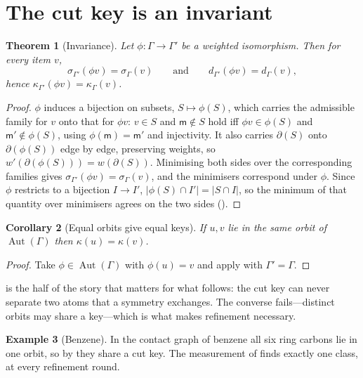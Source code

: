 \documentclass[11pt,twocolumn,a4paper]{article}
\theoremstyle{crthm}
\newtheorem{theorem}{Theorem}[section]
\newtheorem{corollary}[theorem]{Corollary}
\theoremstyle{definition}
\newtheorem{example}[theorem]{Example}
\theoremstyle{remark}
\newcommand{\Gph}{\Gamma}
\newcommand{\wt}{w}
\newcommand{\med}{\mathsf{m}}
\newcommand{\cut}{\partial}
\newcommand{\sep}{\sigma}
\newcommand{\dep}{d}
\newcommand{\key}{\kappa}
\newcommand{\abs}[1]{\lvert#1\rvert}
\newcommand{\Aut}{\operatorname{Aut}}
\begin{document}
\section{The cut key is an invariant}
\label{sec:invariant}

\begin{theorem}[Invariance]
\label{thm:invariance}
Let $\phi\colon\Gph\to\Gph'$ be a weighted isomorphism. Then for every
item $v$,
\[
\sep_{\Gph'}(\phi v)=\sep_{\Gph}(v)
\qquad\text{and}\qquad
\dep_{\Gph'}(\phi v)=\dep_{\Gph}(v),
\]
hence $\key_{\Gph'}(\phi v)=\key_{\Gph}(v)$.
\end{theorem}

\begin{proof}
$\phi$ induces a bijection on subsets, $S\mapsto\phi(S)$, which carries
the admissible family for $v$ onto that for $\phi v$: $v\in S$ and
$\med\notin S$ hold iff $\phi v\in\phi(S)$ and $\med'\notin\phi(S)$, using
$\phi(\med)=\med'$ and injectivity. It also carries $\cut(S)$ onto
$\cut(\phi(S))$ edge by edge, preserving weights, so
$\wt'(\cut(\phi(S)))=\wt(\cut(S))$. Minimising both sides over the
corresponding families gives $\sep_{\Gph'}(\phi v)=\sep_{\Gph}(v)$, and
the minimisers correspond under $\phi$. Since $\phi$ restricts to a
bijection $I\to I'$, $\abs{\phi(S)\cap I'}=\abs{S\cap I}$, so the minimum
of that quantity over minimisers agrees on the two sides
().
\end{proof}

\begin{corollary}[Equal orbits give equal keys]
\label{cor:orbit-key}
If $u,v$ lie in the same orbit of $\Aut(\Gph)$ then $\key(u)=\key(v)$.
\end{corollary}

\begin{proof}
Take $\phi\in\Aut(\Gph)$ with $\phi(u)=v$ and apply
 with $\Gph'=\Gph$.
\end{proof}

 is the half of the story that matters for what
follows: the cut key can never separate two atoms that a symmetry
exchanges. The converse fails---distinct orbits may share a key---which is
what makes refinement necessary.

\begin{example}[Benzene]
\label{ex:benzene}
In the contact graph of benzene all six ring carbons lie in one orbit, so
by  they share a cut key. The measurement of
 finds exactly one class, at every refinement round.
\end{example}
\end{document}
